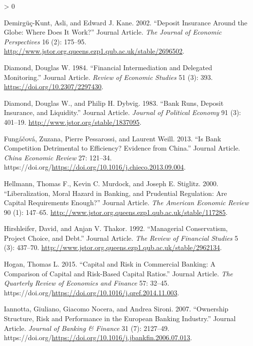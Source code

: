 \documentclass{article}
\newlength{\cslhangindent}
\newenvironment{CSLReferences}[2] %
 {%
  \setlength{\parindent}{0pt}
  \ifodd #1 \everypar{\setlength{\hangindent}{\cslhangindent}}\ignorespaces\fi
  \ifnum #2 > 0
  \setlength{\parskip}{#2\baselineskip}
  \fi
 }%
 {}
\begin{document}
\begin{CSLReferences}{1}{0}
\leavevmode\hypertarget{ref-RN44}{}%
Demirgüç-Kunt, Asli, and Edward J. Kane. 2002. {``Deposit Insurance
Around the Globe: Where Does It Work?''} Journal Article. \emph{The
Journal of Economic Perspectives} 16 (2): 175--95.
\url{http://www.jstor.org.queens.ezp1.qub.ac.uk/stable/2696502}.

\leavevmode\hypertarget{ref-RN45}{}%
Diamond, Douglas W. 1984. {``Financial Intermediation and Delegated
Monitoring.''} Journal Article. \emph{Review of Economic Studies} 51
(3): 393. \url{https://doi.org/10.2307/2297430}.

\leavevmode\hypertarget{ref-RN46}{}%
Diamond, Douglas W., and Philip H. Dybvig. 1983. {``Bank Runs, Deposit
Insurance, and Liquidity.''} Journal Article. \emph{Journal of Political
Economy} 91 (3): 401--19. \url{http://www.jstor.org/stable/1837095}.

\leavevmode\hypertarget{ref-RN47}{}%
Fungáčová, Zuzana, Pierre Pessarossi, and Laurent Weill. 2013. {``Is
Bank Competition Detrimental to Efficiency? Evidence from China.''}
Journal Article. \emph{China Economic Review} 27: 121--34.
https://doi.org/\url{https://doi.org/10.1016/j.chieco.2013.09.004}.

\leavevmode\hypertarget{ref-RN48}{}%
Hellmann, Thomas F., Kevin C. Murdock, and Joseph E. Stiglitz. 2000.
{``Liberalization, Moral Hazard in Banking, and Prudential Regulation:
Are Capital Requirements Enough?''} Journal Article. \emph{The American
Economic Review} 90 (1): 147--65.
\url{http://www.jstor.org.queens.ezp1.qub.ac.uk/stable/117285}.

\leavevmode\hypertarget{ref-RN49}{}%
Hirshleifer, David, and Anjan V. Thakor. 1992. {``Managerial
Conservatism, Project Choice, and Debt.''} Journal Article. \emph{The
Review of Financial Studies} 5 (3): 437--70.
\url{http://www.jstor.org.queens.ezp1.qub.ac.uk/stable/2962134}.

\leavevmode\hypertarget{ref-RN50}{}%
Hogan, Thomas L. 2015. {``Capital and Risk in Commercial Banking: A
Comparison of Capital and Risk-Based Capital Ratios.''} Journal Article.
\emph{The Quarterly Review of Economics and Finance} 57: 32--45.
https://doi.org/\url{https://doi.org/10.1016/j.qref.2014.11.003}.

\leavevmode\hypertarget{ref-RN51}{}%
Iannotta, Giuliano, Giacomo Nocera, and Andrea Sironi. 2007.
{``Ownership Structure, Risk and Performance in the European Banking
Industry.''} Journal Article. \emph{Journal of Banking \& Finance} 31
(7): 2127--49.
https://doi.org/\url{https://doi.org/10.1016/j.jbankfin.2006.07.013}.


\end{CSLReferences}
\end{document}
